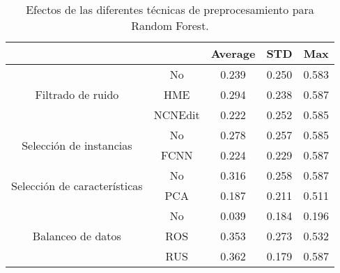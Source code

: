 \begin{table}[t]
    \centering
    \begin{tabular}{cc|c|c|c|}
    \cline{3-5}
    \multicolumn{1}{l}{\textbf{}} & \textbf{} & \multicolumn{1}{c|}{\textbf{Average}} & \multicolumn{1}{c|}{\textbf{STD}} & \textbf{Max} \\ \hline
    \multicolumn{1}{|c|}{\multirow{3}{*}{Filtrado de ruido}}       & No        & 0.239  & 0.250
    & 0.583    \\ \cline{2-5} 
    \multicolumn{1}{|c|}{}  & HME       & 0.294  & 0.238
    & 0.587        \\ \cline{2-5} 
    \multicolumn{1}{|c|}{}  & NCNEdit   & 0.222  & 0.252
    & 0.585        \\ \hline
    \multicolumn{1}{|c|}{\multirow{2}{*}{Selección de instancias}} & No        & 0.278   & 0.257
    & 0.585        \\ \cline{2-5} 
    \multicolumn{1}{|c|}{}  & FCNN      & 0.224  & 0.229
    & 0.587        \\ \hline
    \multicolumn{1}{|c|}{\multirow{2}{*}{Selección de características}} & No        & 0.316  &  0.258
    & 0.587        \\ \cline{2-5} 
    \multicolumn{1}{|c|}{}  & PCA      & 0.187   & 0.211
    & 0.511        \\ \hline
    \multicolumn{1}{|c|}{\multirow{3}{*}{Balanceo de datos}}       & No        & 0.039  & 0.184
    & 0.196        \\ \cline{2-5} 
    \multicolumn{1}{|c|}{}  & ROS       & 0.353  & 0.273
    & 0.532        \\ \cline{2-5} 
    \multicolumn{1}{|c|}{}  & RUS       & 0.362  & 0.179
    & 0.587        \\ \hline
    \end{tabular}
    \caption{Efectos de las diferentes técnicas de preprocesamiento para Random Forest.}
    \label{rf}
\end{table}

